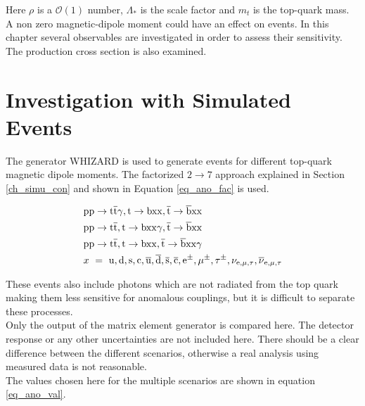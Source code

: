 Here $\rho$ is a $\mathcal{O}(1)$ number, $\Lambda_{\ast}$ is the scale factor and $m_t$ is the top-quark mass.\\
A non zero magnetic-dipole moment could have an effect on \ttgamma events. In this chapter several observables are investigated in order to assess their sensitivity. The production cross section is also examined.

\section{Investigation with Simulated Events}

The generator WHIZARD is used to generate events for different top-quark magnetic dipole moments. The factorized $2 \to 7$ approach explained in Section \ref{ch_simu_con} and shown in Equation \ref{eq_ano_fac} is used.

\begin{equation}
\begin{split}
& \mathrm{pp}\to \mathrm{t}\overline{\mathrm{t}} \gamma,  \mathrm{t} \to \mathrm{bxx},  \overline{\mathrm{t}} \to \overline{\mathrm{b}} \mathrm{xx} \\
& \mathrm{pp}\to \mathrm{t} \overline{\mathrm{t}},  \mathrm{t} \to \mathrm{bxx} \gamma,  \overline{\mathrm{t}} \to \overline{\mathrm{b}} \mathrm{xx} \\
& \mathrm{pp}\to \mathrm{t} \overline{\mathrm{t}},  \mathrm{t} \to \mathrm{bxx},  \overline{\mathrm{t}} \to \overline{\mathrm{b}} \mathrm{xx} \gamma \\
&  x\ = \ \mathrm{u}, \mathrm{d}, \mathrm{s}, \mathrm{c}, \overline{\mathrm{u}}, \overline{\mathrm{d}},  \overline{\mathrm{s}},  \overline{\mathrm{c}}, \mathrm{e}^{\pm}, \mu^{\pm}, \tau^{\pm}, \nu_{\mathrm{e},\mu,\tau}, \overline{\nu}_{\mathrm{e},\mu,\tau} 
\end{split}
\label{eq_ano_fac}
\end{equation}

These events also include photons which are not radiated from the top quark making them less sensitive for anomalous couplings, but it is difficult to separate these processes.\\
Only the output of the matrix element generator is compared here. The detector response or any other uncertainties are not included here.
There should be a clear difference between the different scenarios, otherwise a real analysis using measured data is not reasonable.\\
The values chosen here for the multiple scenarios are shown in equation \ref{eq_ano_val}.

